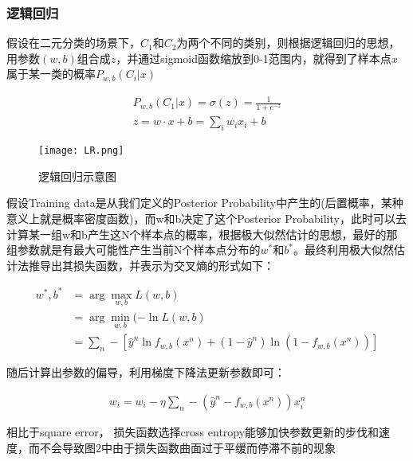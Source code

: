 \subsubsection{逻辑回归}

假设在二元分类的场景下，$C_1$和$C_2$为两个不同的类别，则根据逻辑回归的思想，用参数$(w,b)$组合成$z$，并通过sigmoid函数缩放到0-1范围内，就得到了样本点$x$属于某一类的概率$P_{w,b}(C_i|x)$


\begin{equation}
    \begin{aligned}
        P_{w,b}(C_1|x)=\sigma(z)=\frac{1}{1+e^{-z}} \\
        z=w\cdot x+b=\sum\limits_i w_ix_i+b
    \end{aligned}
\end{equation}

\begin{figure}[H]
    \centering
    \texttt{[image: LR.png]}
    \caption{逻辑回归示意图}
    \label{fig:LR}
\end{figure}

假设Training data是从我们定义的Posterior Probability中产生的(后置概率，某种意义上就是概率密度函数)，而w和b决定了这个Posterior Probability，此时可以去计算某一组w和b产生这N个样本点的概率，根据极大似然估计的思想，最好的那组参数就是有最大可能性产生当前N个样本点分布的$w^*$和$b^*$。最终利用极大似然估计法推导出其损失函数，并表示为交叉熵的形式如下：

\begin{equation}
    \begin{aligned}
        w^*,b^* & =\arg \max\limits_{w,b} L(w,b)                                                 \\
                & =\arg\min\limits_{w,b}(-\ln L(w,b)                                             \\
                & =\sum\limits_n -[\hat{y}^n \ln f_{w,b}(x^n)+(1-\hat{y}^n) \ln(1-f_{w,b}(x^n))]
    \end{aligned}
\end{equation}

随后计算出参数的偏导，利用梯度下降法更新参数即可：

\begin{equation}
    \begin{aligned}
        w_i=w_i-\eta \sum\limits_{n}-(\hat{y}^n-f_{w,b}(x^n))x_i^n
    \end{aligned}
\end{equation}

相比于square error， 损失函数选择cross entropy能够加快参数更新的步伐和速度，而不会导致图2中由于损失函数曲面过于平缓而停滞不前的现象

